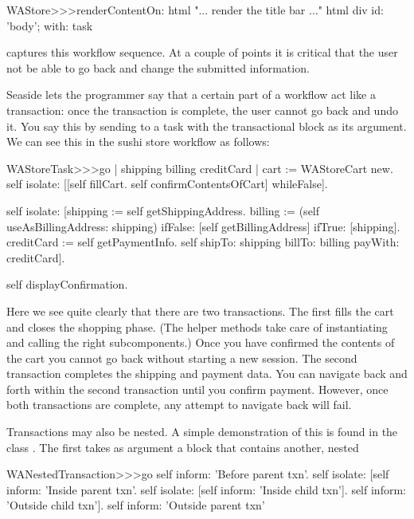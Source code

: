 \documentclass[a4paper,10pt,twoside]{book}
\begin{document}
\begin{code}{}
WAStore>>>renderContentOn: html
	"... render the title bar ..."
	html div id: 'body'; with: task
\end{code}

 captures this workflow sequence. At a couple of points it is critical that the user not be able to go back and change the submitted information.


Seaside lets the programmer say that a certain part of a workflow act like a transaction: once the transaction is complete, the user cannot go back and undo it.
You say this by sending  to a task with the transactional block as its argument.
We can see this in the sushi store workflow as follows:

\begin{code}{}
WAStoreTask>>>go
	| shipping billing creditCard |
	cart := WAStoreCart new.
	self isolate:
		[[self fillCart.
		self confirmContentsOfCart]
			whileFalse].

	self isolate:
		[shipping := self getShippingAddress.
		billing := (self useAsBillingAddress: shipping)
					ifFalse: [self getBillingAddress]
					ifTrue: [shipping].
		creditCard := self getPaymentInfo.
		self shipTo: shipping billTo: billing payWith: creditCard].

	self displayConfirmation.
\end{code}

Here we see quite clearly that there are two transactions.
The first fills the cart and closes the shopping phase.
(The helper methods  \etc take care of instantiating and calling the right subcomponents.)
Once you have confirmed the contents of the cart you cannot go back without starting a new session.
The second transaction completes the shipping and payment data.
You can navigate back and forth within the second transaction until you confirm payment.
However, once both transactions are complete, any attempt to navigate back will fail.

Transactions may also be nested.
A simple demonstration of this is found in the class .
The first  takes as argument a block that contains another, nested 

\begin{code}{}
WANestedTransaction>>>go
	self inform: 'Before parent txn'.
	self isolate:
			[self inform: 'Inside parent txn'.
			self isolate: [self inform: 'Inside child txn'].
			self inform: 'Outside child txn'].
	self inform: 'Outside parent txn'
\end{code}
\end{document}
